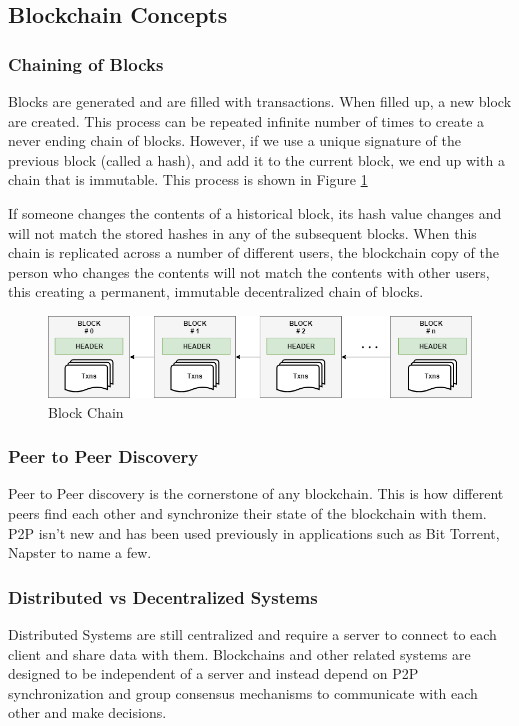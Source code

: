 \documentclass[11pt,openright]{report}
\begin{document}
\subsection{Blockchain Concepts}
\subsubsection{Chaining of Blocks}
Blocks are generated and are filled with transactions. When filled up, a new block are created. This process can be repeated infinite number of times to create a never ending chain of blocks. However, if we use a unique signature of the previous block (called a hash), and add it to the current block, we end up with a chain that is immutable. This process is shown in Figure \ref{fig:Chained Blocks}

If someone changes the contents of a historical block, its hash value changes and will not match the stored hashes in any of the subsequent blocks. When this chain is replicated across a number of different users, the blockchain copy of the person who changes the contents will not match the contents with other users, this creating a permanent, immutable decentralized chain of blocks.

\begin{figure}
	\centering
	\includegraphics[scale=0.5]{images/Blockchain.png}
	\caption{Block Chain}
	\label{fig:Chained Blocks}
\end{figure}

\subsubsection{Peer to Peer Discovery}
Peer to Peer discovery\cite{inproceedings} is the cornerstone of any blockchain. This is how different peers find each other and synchronize their state of the blockchain with them. P2P isn't new and has been used previously in applications such as Bit Torrent, Napster to name a few.

\subsubsection{Distributed vs Decentralized Systems}
Distributed Systems \cite{7925332} are still centralized and require a server to connect to each client and share data with them. Blockchains and other related systems are designed to be independent of a server and instead depend on P2P synchronization and group consensus mechanisms to communicate with each other and make decisions.
\end{document}
